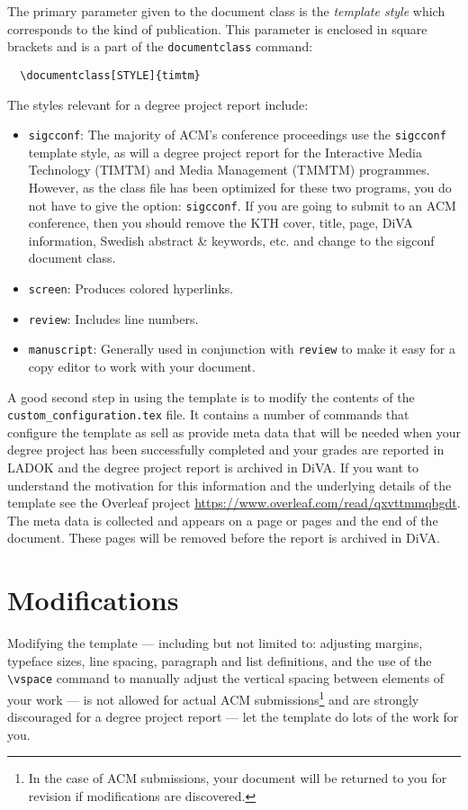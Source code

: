 \documentclass[manuscript, screen]{timtm}
\begin{document}
The primary parameter given to the document class is
the {\itshape template style} which corresponds to the kind of publication. This parameter is enclosed in square
brackets and is a part of the {\verb|documentclass|} command:
\begin{verbatim}
  \documentclass[STYLE]{timtm}
\end{verbatim}

The styles relevant for a degree project report include:
\begin{itemize}
\item {\verb|sigcconf|}: The majority of ACM's conference proceedings use the {\verb|sigcconf|} template style, as will a degree project report for the Interactive Media Technology (TIMTM) and Media Management (TMMTM) programmes. However, as the class file has been optimized for these two programs, you do not have to give the option: {\verb|sigcconf|}. If you are going to submit to an ACM conference, then you should remove the KTH cover, title, page, DiVA information, Swedish abstract \& keywords, etc. and change to the sigconf document class.
\item {\verb|screen|}: Produces colored hyperlinks.
\item {\verb|review|}: Includes line numbers.
\item {\verb|manuscript|}: Generally used in conjunction with \verb|review| to make it easy for a copy editor to work with your document.
\end{itemize}

A good second step in using the template is to modify the contents of the \texttt{custom\_configuration.tex} file. It contains a number of commands that configure the template as sell as provide meta data that will be needed when your degree project has been successfully completed and your grades are reported in LADOK and the degree project report is archived in DiVA. If you want to understand the motivation for this information and the underlying details of the template see the Overleaf project \url{https://www.overleaf.com/read/qxvttmmqbgdt}. The meta data is collected and appears on a page or pages and the end of the document. These pages will be removed before the report is archived in DiVA.

\section{Modifications}

Modifying the template --- including but not limited to: adjusting
margins, typeface sizes, line spacing, paragraph and list definitions,
and the use of the \verb|\vspace| command to manually adjust the
vertical spacing between elements of your work --- is not allowed for actual ACM submissions\footnote{In the case of ACM submissions, your document will be returned to you for revision if modifications are discovered.} and are strongly discouraged for a degree project report --- let the template do lots of the work for you.
\end{document}

